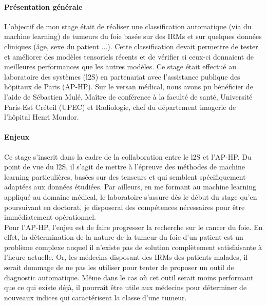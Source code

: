 \documentclass[preprint,12pt]{elsarticle}
\begin{document}
\paragraph*{Présentation générale} L'objectif de mon stage était de réaliser une classification automatique (via du machine learning) de tumeurs du foie basée sur des IRMs et sur quelques données cliniques (âge, sexe du patient ...). Cette classification devait permettre de tester et améliorer des modèles tensoriels récents \cite{multi_rank_1,multi_rank_r} et de vérifier si ceux-ci donnaient de meilleures performances que les autres modèles. Ce stage était effectué au laboratoire des systèmes (l2S) en partenariat avec l'assistance publique des hôpitaux de Paris (AP-HP). Sur le versan médical, nous avons pu bénéficier de l'aide de Sébastien Mulé, Maître de conférence à la faculté de santé, Université Paris-Est Créteil (UPEC) et Radiologie, chef du département imagerie de l'hôpital Henri Mondor.

\paragraph*{Enjeux} Ce stage s'inscrit dans la cadre de la collaboration entre le l2S et l'AP-HP. Du point de vue du l2S, il s'agit de mettre à l'épreuve des méthodes de machine learning particulières, basées sur des tenseurs et qui semblent spécifiquement adaptées aux données étudiées. Par ailleurs, en me formant au machine learning appliqué au domaine médical, le laboratoire s'assure dès le début du stage qu'en poursuivant en doctorat, je disposerai des compétences nécessaires pour être immédiatement opérationnel.\\
\indent Pour l'AP-HP, l'enjeu est de faire progresser la recherche sur le cancer du foie. En effet, la détermination de la nature de la tumeur du foie d'un patient est un problème complexe auquel il n'existe pas de solution complètement satisfaisante à l'heure actuelle. Or, les médecins disposant des IRMs des patients malades, il serait dommage de ne pas les utiliser pour tenter de proposer un outil de diagnostic automatique. Même dans le cas où cet outil serait moins performant que ce qui existe déjà, il pourraît être utile aux médecins pour déterminer de nouveaux indices qui caractérisent la classe d'une tumeur.
\end{document}
